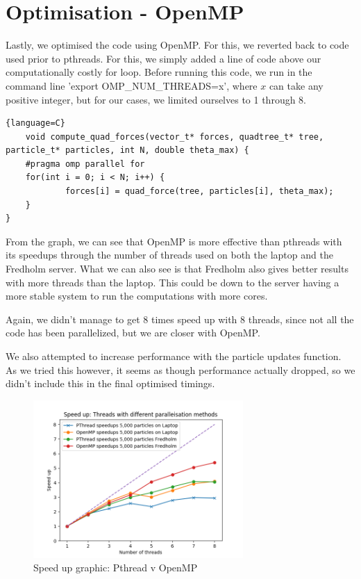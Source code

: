 \documentclass{article}
\begin{document}
\section{Optimisation - OpenMP}
Lastly, we optimised the code using OpenMP. For this, we reverted back to code used prior to pthreads. For this, we simply added a line of code above our computationally costly for loop. Before running this code, we run in the command line 'export OMP\_NUM\_THREADS=x', where $x$ can take any positive integer, but for our cases, we limited ourselves to 1 through 8.
\begin{lstlisting}{language=C}
    void compute_quad_forces(vector_t* forces, quadtree_t* tree, particle_t* particles, int N, double theta_max) {
    #pragma omp parallel for
    for(int i = 0; i < N; i++) {
            forces[i] = quad_force(tree, particles[i], theta_max);
    }
}
\end{lstlisting}
From the graph, we can see that OpenMP is more effective than pthreads with its speedups through the number of threads used on both the laptop and the Fredholm server. What we can also see is that Fredholm also gives better results with more threads than the laptop. This could be down to the server having a more stable system to run the computations with more cores.\vspace{0.3cm}

Again, we didn't manage to get 8 times speed up with 8 threads, since not all the code has been parallelized, but we are closer with OpenMP.\vspace{0.3cm}

We also attempted to increase performance with the particle updates function. As we tried this however, it seems as though performance actually dropped, so we didn't include this in the final optimised timings.\vspace{0.3cm}

\begin{figure}[htb]
\begin{center}
\includegraphics[width=8cm]{images/openmpVpthread1.png}
\caption{Speed up graphic: Pthread v OpenMP}
\end{center}
\end{figure}
\newpage
\end{document}

